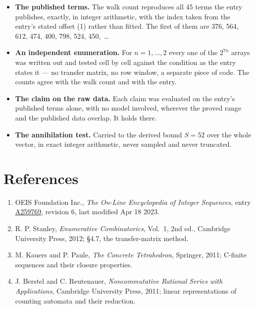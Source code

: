 \documentclass[11pt]{article}
\theoremstyle{definition}
\begin{document}
\begin{itemize}

\item {\bfseries The published terms.} The walk count reproduces all 45 terms the entry publishes, exactly, in integer arithmetic, with the index taken from the entry's stated offset (1) rather than fitted. The first of them are 376, 564, 612, 474, 400, 798, 524, 450,~\dots

\item {\bfseries An independent enumeration.} For $n = 1,\dots,2$ every one of the $2^{7n}$ arrays was written out and tested cell by cell against the condition as the entry states it --- no transfer matrix, no row window, a separate piece of code. The counts agree with the walk count and with the entry.

\item {\bfseries The claim on the raw data.} Each claim was evaluated on the entry's published terms alone, with no model involved, wherever the proved range and the published data overlap. It holds there.

\item {\bfseries The annihilation test.} Carried to the derived bound $S = 52$ over the whole vector, in exact integer arithmetic, never sampled and never truncated.

\end{itemize}

\section{References}

\begin{enumerate}

\item OEIS Foundation Inc., \emph{The On-Line Encyclopedia of Integer Sequences}, entry \href{https://oeis.org/A259769}{A259769}, revision 6, last modified Apr 18 2023.

\item R. P. Stanley, \emph{Enumerative Combinatorics}, Vol.~1, 2nd ed., Cambridge University Press, 2012; \S4.7, the transfer-matrix method.

\item M. Kauers and P. Paule, \emph{The Concrete Tetrahedron}, Springer, 2011; C-finite sequences and their closure properties.

\item J. Berstel and C. Reutenauer, \emph{Noncommutative Rational Series with Applications}, Cambridge University Press, 2011; linear representations of counting automata and their reduction.

\end{enumerate}
\end{document}
